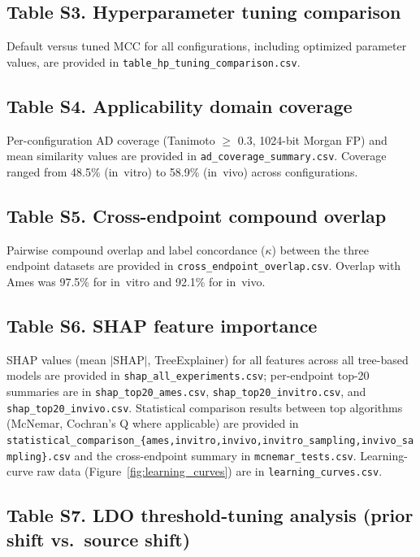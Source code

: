 \subsection*{Table S3. Hyperparameter tuning comparison}

Default versus tuned MCC for all configurations, including optimized parameter values, are 
provided in \texttt{table\_hp\_tuning\_comparison.csv}.

\subsection*{Table S4. Applicability domain coverage}

Per-configuration AD coverage (Tanimoto $\geq$ 0.3, 1024-bit Morgan FP) and mean similarity 
values are provided in \texttt{ad\_coverage\_summary.csv}. Coverage ranged from 48.5\% 
(in~vitro) to 58.9\% (in~vivo) across configurations.

\subsection*{Table S5. Cross-endpoint compound overlap}

Pairwise compound overlap and label concordance ($\kappa$) between the three endpoint 
datasets are provided in \texttt{cross\_endpoint\_overlap.csv}. Overlap with Ames was 
97.5\% for in~vitro and 92.1\% for in~vivo.

\subsection*{Table S6. SHAP feature importance}

SHAP values (mean $|$SHAP$|$, TreeExplainer) for all features across all tree-based models 
are provided in \texttt{shap\_all\_experiments.csv}; per-endpoint top-20 summaries are in 
\texttt{shap\_top20\_ames.csv}, \texttt{shap\_top20\_invitro.csv}, and 
\texttt{shap\_top20\_invivo.csv}. Statistical comparison results between top algorithms 
(McNemar, Cochran's Q where applicable) are provided in 
\texttt{statistical\_comparison\_\{ames,invitro,invivo,invitro\_sampling,invivo\_sampling\}.csv} 
and the cross-endpoint summary in \texttt{mcnemar\_tests.csv}. Learning-curve raw data 
(Figure~\ref{fig:learning_curves}) are in \texttt{learning\_curves.csv}.

\subsection*{Table S7. LDO threshold-tuning analysis (prior shift vs.\ source shift)}

